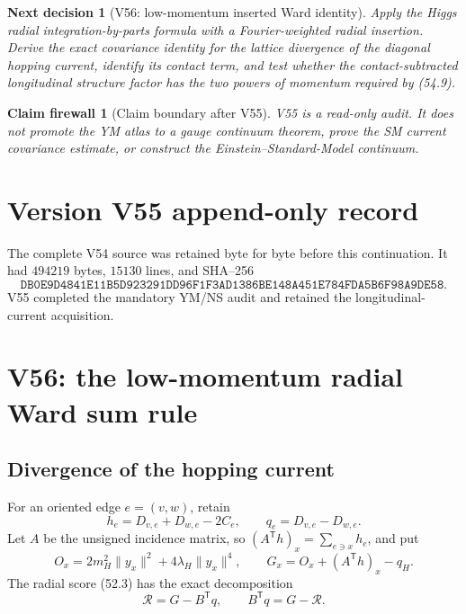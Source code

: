 \documentclass[11pt]{article}
\newtheorem{firewall}[theorem]{Claim firewall}
\newtheorem{decision}[theorem]{Next decision}
\theoremstyle{remark}
\begin{document}
\begin{decision}[V56: low-momentum inserted Ward identity]
\label{dec:v17v55-next}
Apply the Higgs radial integration-by-parts formula with a
Fourier-weighted radial insertion.  Derive the exact covariance
identity for the lattice divergence of the diagonal hopping current,
identify its contact term, and test whether the contact-subtracted
longitudinal structure factor has the two powers of momentum required
by (54.9).
\end{decision}

\begin{firewall}[Claim boundary after V55]
\label{fire:v17v55}
V55 is a read-only audit.  It does not promote the YM atlas to a gauge
continuum theorem, prove the SM current covariance estimate, or
construct the Einstein--Standard-Model continuum.
\end{firewall}

\section*{Version V55 append-only record}
The complete V54 source was retained byte for byte before this
continuation.  It had \(494219\) bytes, \(15130\) lines, and SHA--256
\[
 \texttt{DB0E9D4841E11B5D923291DD96F1F3AD1386BE148A451E784FDA5B6F98A9DE58}.
\]
V55 completed the mandatory YM/NS audit and retained the
longitudinal-current acquisition.


\section{V56: the low-momentum radial Ward sum rule}
\label{sec:v17v56}

\subsection{Divergence of the hopping current}

For an oriented edge \(e=(v,w)\), retain
\[
 h_e=D_{v,e}+D_{w,e}-2C_e,\qquad
 q_e=D_{v,e}-D_{w,e}.                             \tag{56.1}
\]
Let \(A\) be the unsigned incidence matrix, so
\((A^{\mathsf T}h)_x=\sum_{e\ni x}h_e\), and put
\[
 O_x=2m_H^2\|y_x\|^2+4\lambda_H\|y_x\|^4,\qquad
 G_x=O_x+(A^{\mathsf T}h)_x-q_H.                 \tag{56.2}
\]
The radial score (52.3) has the exact decomposition
\[
\boxed{
 \mathscr R=G-B^{\mathsf T}q,\qquad
 B^{\mathsf T}q=G-\mathscr R.}                   \tag{56.3}
\]
\end{document}
